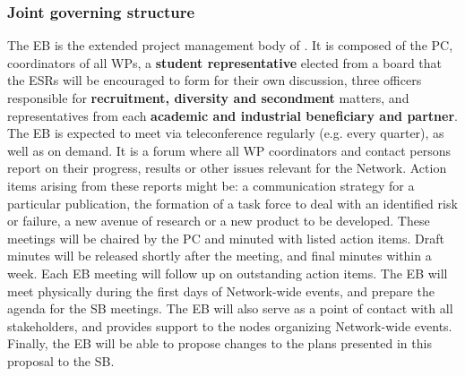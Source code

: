 %
\vspace{-2mm}
\subsubsection{Joint governing structure}%
\label{sub:jointGoverningStructure}

The EB is the extended project management body of \acronym. 
It is composed of the PC, coordinators of all WPs, a \textbf{student representative} elected from a board that the ESRs will be encouraged to form for their own discussion, three officers responsible for \textbf{recruitment, diversity and secondment} matters, and representatives from each \textbf{academic and industrial beneficiary and partner}. 
The EB is expected to meet via teleconference regularly (e.g. every quarter), as well as on demand.
It is a forum where all WP coordinators and contact persons report on their progress, results or other issues relevant for the Network. 
Action items arising from these reports might be: a communication strategy for a particular publication, the formation of a task force to deal with an identified risk or failure, a new avenue of research or a new product to be developed. 
These meetings will be chaired by the PC and minuted with listed action items. 
Draft minutes will be released shortly after the meeting, and final minutes within a week. 
Each EB meeting will follow up on outstanding action items.
The EB will meet physically during the first days of Network-wide events, and prepare the agenda for the SB meetings. 
The EB will also serve as a point of contact with all \acronym stakeholders, and provides support to the nodes organizing Network-wide events.
Finally, the EB will be able to propose changes to the plans presented in this proposal to the SB.

